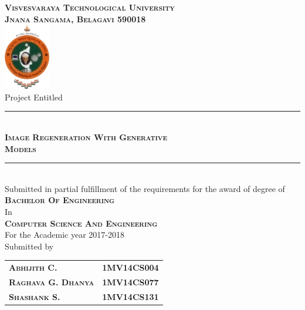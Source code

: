 

\begin{titlepage} %
	\newcommand{\HRule}{\rule{\linewidth}{0.5mm}} %

	\center %

	\textsc{\Large \textbf{Visvesvaraya Technological University\\[3pt]Jnana Sangama, Belagavi 590018}}\\[10pt] 
	\includegraphics[width=0.15\textwidth]{images/vtu.png}\\[10pt] 

	{\large Project Entitled}\\[5pt] %


	\HRule\\[10pt]
	\textsc{ \textbf{\LARGE Image Regeneration With Generative \\[5pt] Models}}\\[10pt]

	\HRule\\[10pt]
	Submitted in partial fulfillment of the requirements for the award of degree of\\
	\large{
		\textsc{
		\textbf{Bachelor Of Engineering}}\\
		In \\
		\textsc{
		\textbf{Computer Science And Engineering}} \\
		For the Academic year 2017-2018 
	}\\[10pt]
	\large{Submitted by}\\[2pt]
	\begin{tabular}{ l r }
		\textsc{\large \textbf{Abhijith C.}}       & \large \textbf{1MV14CS004} \\
		\textsc{\large \textbf{Raghava G. Dhanya}} & \large \textbf{1MV14CS077} \\
		\textsc{\large \textbf{Shashank S.}}       & \large \textbf{1MV14CS131}
	\end{tabular}\\[15pt]


\end{titlepage}
